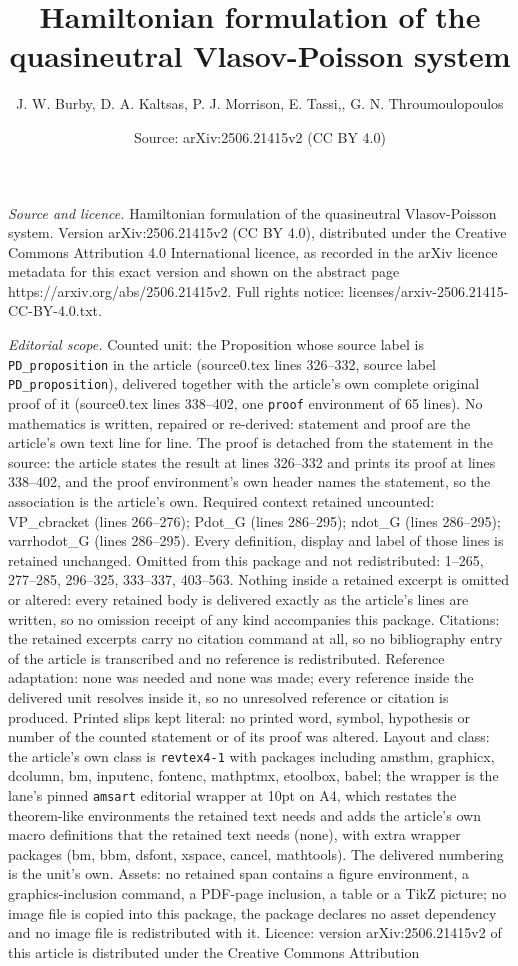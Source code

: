 \documentclass[10pt,a4paper]{amsart}
\title[Hamiltonian formulation of the quasineutral Vlasov-Poisson s]{Hamiltonian formulation of the quasineutral Vlasov-Poisson system}
\author{J. W. Burby, D. A. Kaltsas, P. J. Morrison, E. Tassi,, G. N. Throumoulopoulos}
\date{Source: arXiv:2506.21415v2 (CC BY 4.0)}
\begin{document}
\maketitle

\noindent\emph{Source and licence.} Hamiltonian formulation of the quasineutral Vlasov-Poisson system. Version arXiv:2506.21415v2 (CC BY 4.0), distributed under the Creative Commons Attribution 4.0 International licence, as recorded in the arXiv licence metadata for this exact version and shown on the abstract page https://arxiv.org/abs/2506.21415v2. Full rights notice: licenses/arxiv-2506.21415-CC-BY-4.0.txt.\par\smallskip

\noindent\textit{Editorial scope.} Counted unit: the Proposition whose source label is \texttt{PD\_proposition} in the article (source0.tex lines 326--332, source label \texttt{PD\_proposition}), delivered together with the article's own complete original proof of it (source0.tex lines 338--402, one \texttt{proof} environment of 65 lines). No mathematics is written, repaired or re-derived: statement and proof are the article's own text line for line. The proof is detached from the statement in the source: the article states the result at lines 326--332 and prints its proof at lines 338--402, and the proof environment's own header names the statement, so the association is the article's own. Required context retained uncounted: VP\_cbracket (lines 266--276); Pdot\_G (lines 286--295); ndot\_G (lines 286--295); varrhodot\_G (lines 286--295). Every definition, display and label of those lines is retained unchanged. Omitted from this package and not redistributed: 1--265, 277--285, 296--325, 333--337, 403--563. Nothing inside a retained excerpt is omitted or altered: every retained body is delivered exactly as the article's lines are written, so no omission receipt of any kind accompanies this package. Citations: the retained excerpts carry no citation command at all, so no bibliography entry of the article is transcribed and no reference is redistributed. Reference adaptation: none was needed and none was made; every reference inside the delivered unit resolves inside it, so no unresolved reference or citation is produced. Printed slips kept literal: no printed word, symbol, hypothesis or number of the counted statement or of its proof was altered. Layout and class: the article's own class is \texttt{revtex4-1} with packages including amsthm, graphicx, dcolumn, bm, inputenc, fontenc, mathptmx, etoolbox, babel; the wrapper is the lane's pinned \texttt{amsart} editorial wrapper at 10pt on A4, which restates the theorem-like environments the retained text needs and adds the article's own macro definitions that the retained text needs (none), with extra wrapper packages (bm, bbm, dsfont, xspace, cancel, mathtools). The delivered numbering is the unit's own. Assets: no retained span contains a figure environment, a graphics-inclusion command, a PDF-page inclusion, a table or a TikZ picture; no image file is copied into this package, the package declares no asset dependency and no image file is redistributed with it. Licence: version arXiv:2506.21415v2 of this article is distributed under the Creative Commons Attribution 
\end{document}
